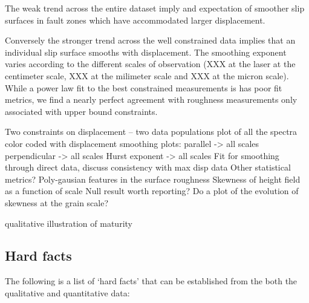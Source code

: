 \documentclass[12pt,a4paper]{article}
\begin{document}
The weak trend across the entire dataset imply and expectation of smoother slip surfaces in fault zones which have accommodated larger displacement. 

Conversely the stronger trend across the well constrained data implies that an individual slip surface smooths with displacement. The smoothing exponent varies according to the different scales of observation (XXX at the laser at the centimeter scale, XXX at the milimeter scale and XXX at the micron scale).  While a power law fit to the best constrained measurements is has poor fit metrics, we find a nearly perfect agreement with roughness measurements only associated with upper bound constraints.


Two constraints on displacement – two data populations
plot of all the spectra color coded with displacement
smoothing plots:
	parallel -> all scales
	perpendicular -> all scales
	Hurst exponent -> all scales
Fit for smoothing through direct data, discuss consistency with max disp data
Other statistical metrics?
	Poly-gausian features in the surface roughness
	Skewness of height field as a function of scale
		Null result worth reporting?
		Do a plot of the evolution of skewness at the grain scale?




qualitative illustration of maturity


\subsection{Hard facts}

The following is a list of  `hard facts' that can be established from the both the qualitative and quantitative data:
\end{document}
